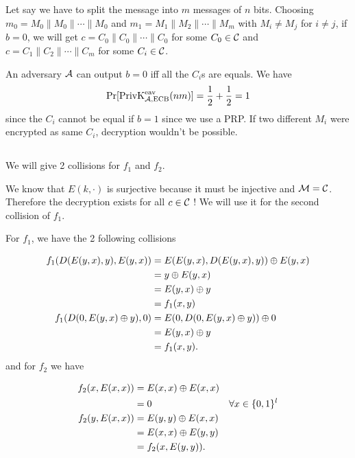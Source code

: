 \subsection{}
\begin{solution}
  Let say we have to split the message into $m$ messages of $n$ bits.
  Choosing $m_0 = M_0 \| M_0 \| \cdots \| M_0$ and $m_1 = M_1 \| M_2 \| \cdots \| M_m$ with $M_i \neq M_j$ for $i \neq j$,
  if $b = 0$, we will get $c = C_0 \| C_0 \| \cdots \| C_0$ for some $C_0 \in \mathcal{C}$ and $c = C_1 \| C_2 \| \cdots \| C_m$ for some $C_i \in \mathcal{C}$.

  An adversary $\mathcal{A}$ can output $b = 0$ iff all the $C_i$s are equals.
  We have
  \[ \Pr[\operatorname{PrivK}^{\text{eav}}_{\mathcal{A},\text{ECB}}(nm)] = \frac{1}{2} + \frac{1}{2} = 1 \]
  since the $C_i$ cannot be equal if $b = 1$ since we use a PRP.
  If two different $M_i$ were encrypted as same $C_i$, decryption wouldn't be possible.
\end{solution}

\subsection{}
\begin{solution}
  We will give 2 collisions for $f_1$ and $f_2$.

  We know that $E(k, \cdot)$ is surjective because it must be injective and $\mathcal{M} = \mathcal{C}$.
  Therefore the decryption exists for all $c \in \mathcal{C}$ ! We will use it for the second collision of $f_1$.

  For $f_1$, we have the 2 following collisions

  \begin{align*}
    f_1(D(E(y,x),y), E(y,x))
    & = E(E(y,x), D(E(y,x), y)) \oplus E(y,x)\\
    & = y \oplus E(y,x)\\
    & = E(y,x) \oplus y\\
    & = f_1(x, y)\\
    f_1(D(0, E(y,x) \oplus y), 0)
    & = E(0, D(0, E(y, x) \oplus y)) \oplus 0\\
    & = E(y, x) \oplus y\\
    & = f_1(x, y).
  \end{align*}
  and for $f_2$ we have

  \begin{align*}
    f_2(x, E(x,x)) & = E(x,x) \oplus E(x,x)\\
                   & = 0 & \forall x \in \{0,1\}^l\\
    f_2(y, E(x,x)) & = E(y,y) \oplus E(x,x)\\
                   & = E(x,x) \oplus E(y,y)\\
                   & = f_2(x, E(y,y)).
  \end{align*}
\end{solution}

